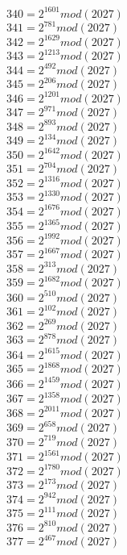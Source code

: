\documentclass[12pt, letterpaper]{article}
\begin{document}
\begin{itemize}
\begin{multicols}{3}
$340= 2^{1601} mod (2027)$\\
$341= 2^{781} mod (2027)$\\
$342= 2^{1629} mod (2027)$\\
$343= 2^{1213} mod (2027)$\\
$344= 2^{492} mod (2027)$\\
$345= 2^{206} mod (2027)$\\
$346= 2^{1201} mod (2027)$\\
$347= 2^{971} mod (2027)$\\
$348= 2^{893} mod (2027)$\\
$349= 2^{134} mod (2027)$\\
$350= 2^{1642} mod (2027)$\\
$351= 2^{704} mod (2027)$\\
$352= 2^{1316} mod (2027)$\\
$353= 2^{1330} mod (2027)$\\
$354= 2^{1676} mod (2027)$\\
$355= 2^{1365} mod (2027)$\\
$356= 2^{1992} mod (2027)$\\
$357= 2^{1667} mod (2027)$\\
$358= 2^{313} mod (2027)$\\
$359= 2^{1682} mod (2027)$\\
$360= 2^{510} mod (2027)$\\
$361= 2^{102} mod (2027)$\\
$362= 2^{269} mod (2027)$\\
$363= 2^{878} mod (2027)$\\
$364= 2^{1615} mod (2027)$\\
$365= 2^{1868} mod (2027)$\\
$366= 2^{1459} mod (2027)$\\
$367= 2^{1358} mod (2027)$\\
$368= 2^{2011} mod (2027)$\\
$369= 2^{658} mod (2027)$\\
$370= 2^{719} mod (2027)$\\
$371= 2^{1561} mod (2027)$\\
$372= 2^{1780} mod (2027)$\\
$373= 2^{173} mod (2027)$\\
$374= 2^{942} mod (2027)$\\
$375= 2^{111} mod (2027)$\\
$376= 2^{810} mod (2027)$\\
$377= 2^{467} mod (2027)$\\

\end{multicols}
\end{itemize}
\end{document}

